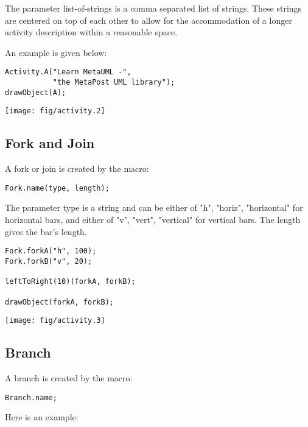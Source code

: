 \documentclass{article}
\newcommand{\code}{\ttfamily}
\begin{document}
The parameter {\code list-of-strings} is a comma separated list of strings. These strings are
centered on top of each other to allow for the accommodation of a longer activity description
within a reasonable space.

An example is given below:

\begin{multicols}{2}
\begin{verbatim}
Activity.A("Learn MetaUML -",
           "the MetaPost UML library");
drawObject(A);
\end{verbatim}
\columnbreak
\hspace{1cm}\texttt{[image: fig/activity.2]}
\end{multicols}

\subsection{Fork and Join}

A fork or join is created by the macro:

\begin{verbatim}
Fork.name(type, length);
\end{verbatim}

The parameter {\code type} is a string and can be either of {\code "h"}, {\code "horiz"}, {\code "horizontal"} for horizontal bars, and either of {\code "v"}, {\code "vert"}, {\code "vertical"} for vertical bars. The {\code length} gives the bar's length.

\begin{multicols}{2}
\begin{verbatim}
Fork.forkA("h", 100);
Fork.forkB("v", 20);

leftToRight(10)(forkA, forkB);

drawObject(forkA, forkB);
\end{verbatim}
\columnbreak
\hspace{1cm}\texttt{[image: fig/activity.3]}
\end{multicols}

\subsection{Branch}

A branch is created by the macro:

\begin{verbatim}
Branch.name;
\end{verbatim}

Here is an example:
\end{document}
